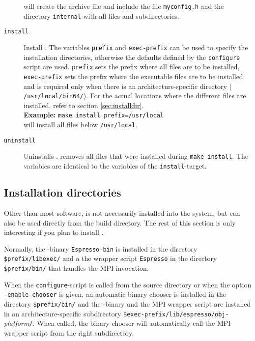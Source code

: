 \begin{description}
  will create the archive file and include the file
  \texttt{myconfig.h} and the directory \texttt{internal} with all
  files and subdirectories.
\item[\texttt{install}] Install \es. The variables \texttt{prefix} and
  \texttt{exec-prefix} can be used to specify the installation
  directories, otherwise the defaults defined by the
  \texttt{configure} script are used. \texttt{prefix} sets the prefix
  where all \es files are to be installed, \texttt{exec-prefix} sets
  the prefix where the executable files are to be installed and is
  required only when there is an architecture-specific directory (\eg
  \texttt{/usr/local/bin64/}).  For the actual locations where the
  different files are installed, refer to section
  \vref{sec:installdir}.\\
  \textbf{Example:} \verb!make install prefix=/usr/local!\\
  will install all files below \texttt{/usr/local}.
\item[\texttt{uninstall}] Uninstalls \es{}, \ie{} removes all files
  that were installed during \texttt{make install}. The variables are
  identical to the variables of the \texttt{install}-target.
\end{description}

\subsection{Installation directories}
\label{sec:installdir}

 Other than most software, \es is not
necessarily installed into the system, but can also be used directly
from the build directory.  The rest of this section is only
interesting if you plan to install \es.

Normally, the \es-binary \texttt{Espresso-bin} is installed in the
directory \texttt{\$prefix/libexec/} and a the wrapper script
\texttt{Espresso} in the directory \texttt{\$prefix/bin/} that handles
the MPI invocation.

When the \texttt{configure}-script is called from the source directory
or when the option \texttt{--enable-chooser} is given, an automatic
binary chooser is installed in the directory \texttt{\$prefix/bin/}
and the \es-binary and the MPI wrapper script are installed in an
architecture-specific subdirectory
\mbox{\texttt{\$exec-prefix/lib/espresso/obj-}\textit{platform}\texttt{/}}.
When called, the binary chooser will automatically call the MPI
wrapper script from the right subdirectory.

